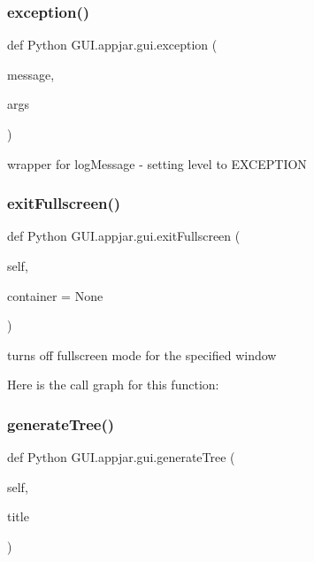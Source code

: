 \subsubsection{\texorpdfstring{exception()}{exception()}}
{\footnotesize\ttfamily def Python G\+U\+I.\+appjar.\+gui.\+exception (\begin{DoxyParamCaption}\item[{}]{message,  }\item[{}]{args }\end{DoxyParamCaption})\hspace{0.3cm}{\ttfamily [static]}}

\begin{DoxyVerb}wrapper for logMessage - setting level to EXCEPTION \end{DoxyVerb}
 \mbox{\label{class_python_01_g_u_i_1_1appjar_1_1gui_a86eac6e52f61172ae977d450c4048733}} 
\subsubsection{\texorpdfstring{exit\+Fullscreen()}{exitFullscreen()}}
{\footnotesize\ttfamily def Python G\+U\+I.\+appjar.\+gui.\+exit\+Fullscreen (\begin{DoxyParamCaption}\item[{}]{self,  }\item[{}]{container = {\ttfamily None} }\end{DoxyParamCaption})}

\begin{DoxyVerb}turns off fullscreen mode for the specified window \end{DoxyVerb}
 Here is the call graph for this function\+:
\mbox{\label{class_python_01_g_u_i_1_1appjar_1_1gui_a1bfdd797681473135fe30e5bc16665ef}} 
\subsubsection{\texorpdfstring{generate\+Tree()}{generateTree()}}
{\footnotesize\ttfamily def Python G\+U\+I.\+appjar.\+gui.\+generate\+Tree (\begin{DoxyParamCaption}\item[{}]{self,  }\item[{}]{title }\end{DoxyParamCaption})}

